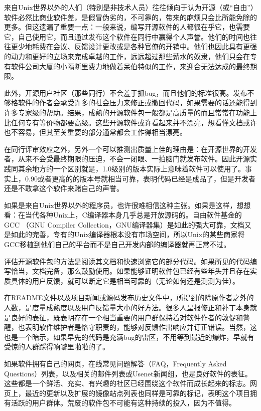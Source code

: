 \documentclass[12pt,oneside]{book}
\begin{document}
\begin{common-format}
来自Unix世界以外的人们（特别是非技术人员）往往倾向于认为开源（或“自由”）软件必然比商业软件差，是假冒伪劣的，不可靠的，带来的麻烦只会比所能免除的更多。但这遗漏了重要一点：一般来说，编写开源软件的人都很在乎它，也需要它，自己使用它，而且通过发布这个软件在同行中赢得个人声誉。他们的时间也往往更少地耗费在会议、反馈设计更改或是各种官僚的开销中。他们也因此具有更强的动力和更好的立场来完成卓越的工作，远远超过那些薪水的奴隶，他们只会在专有软件公司大厦的小隔断里费力地做着呆伯特似的工作，来迎合无法达成的最终期限。

此外，开源用户社区（那些同行）不会羞于抓bug，而且他们的标准很高。发布不够格软件的作者会承受许多的社会压力来修正或撤回代码，如果需要的话还能得到许多专家级的帮助。结果，成熟的开源软件包一般都是高质量的而且常常在功能上比任何专有等价物都要高级。这些开源软件或许看起来并不漂亮，想看懂文档或许也不容易，但其至关重要的部分通常都会工作得相当漂亮。

在同行评审效应之外，另外一个可以推测出质量上佳的理由是：在开源世界的开发者，从来不会受最终期限的压迫，不会一闭眼、一拍脑门就发布软件。因此开源实践同其余地方的一个区别就是，1.0级别的版本实际上意味着软件可以使用了。事实上，0.90或者更高的的版本号就相当可靠，表明代码已经是成品了，但是开发者还是不敢拿这个软件来赌自己的声誉。

如果是来自Unix世界以外的程序员，也许很难相信这种主张。如果是这样，想想看：在当代各种Unix上，C编译器本身几乎总是开放源码的。自由软件基金的GCC （GNU Compiler Collection，GNU编译器集）是如此的强大可靠，文档又是如此的完善，专有的Unix编译器根本没有市场空间，所以Unix的某些商家将GCC移植到他们自己的平台而不是自己开发内部的编译器就再正常不过。

评估开源软件包的方法是阅读其文档和快速浏览它的部分代码。如果所见的代码编写恰当，文档完备，那么鼓励使用。如果能够证明软件包已经有些年头并且存在实质具体的用户反馈，就可以断定它是相当可靠的（无论如何还是测测为佳）。

在README文件以及项目新闻或源码发布历史文件中，所提到的除原作者之外的人数，是度量成熟度以及用户反馈量大小的好方法。很多人呈报修正和补丁本身就是良好的表征，既表明存在一个相当重要的用户群保持着对软件作者的敦促和警醒，也表明软件维护者是恪守职责的，能够对反馈作出响应并订正错误。当然，这也是一个暗示，如果早先的代码是充满bug的雷区，不用等到最近的爆炸，早就有受惊的人群踩得响噼里啪啦的了。

如果软件拥有自己的网页，在线常见问题解答（FAQ，Frequently Asked Questions）列表，以及相关的邮件列表或Usenet新闻组，也是良好软件的表征。这些都是一个鲜活、充实、有兴趣的社区已经围绕这个软件而成长起来的标志。网页上，最近的更新以及扩展的镜像站点列表也同样是可靠的标记，表明这个项目拥有活跃的用户群体。荒废的软件包不可能有这种持续的投入，因为不值得。


\end{common-format}
\end{document}
